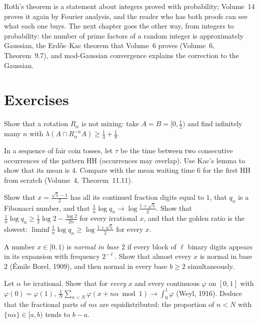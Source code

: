 Roth's theorem is a statement about integers proved with probability; Volume~14 proves it again by Fourier analysis, and the reader who has both
proofs can see what each one buys. The next chapter goes the other way, from integers to probability: the number of prime factors of a random
integer is approximately Gaussian, the Erd\H os--Kac theorem that Volume~6 proves (Volume~6, Theorem~9.7), and mod-Gaussian convergence explains the
correction to the Gaussian.

\section{Exercises}

\begin{exercise}[$\star$]\label{ex:rotnotmix}
Show that a rotation $R_\alpha$ is not mixing: take $A=B=[0,\frac12)$ and find infinitely many $n$ with $\lambda(A\cap R_\alpha^{-n}A)\ge\frac14+\frac18$.
\end{exercise}

\begin{exercise}[$\star$]\label{ex:kacword}
In a sequence of fair coin tosses, let $\tau$ be the time between two consecutive occurrences of the pattern HH (occurrences may overlap). Use Kac's lemma to show that its mean is $4$. Compare with the mean waiting time $6$
for the first HH from scratch (Volume~4, Theorem~11.11).
\end{exercise}

\begin{exercise}[$\star$]\label{ex:golden}
Show that $x=\frac{\sqrt5-1}2$ has all its continued fraction digits equal to $1$, that $q_n$ is a Fibonacci number, and that $\frac1n\log q_n\to\log\frac{1+\sqrt5}2$. Show that $\frac1n\log q_n\ge\frac12\log 2-\frac{\log2}{2n}$ for every
irrational $x$, and that the golden ratio is the slowest: $\liminf\frac1n\log q_n\ge\log\frac{1+\sqrt5}2$ for every $x$.
\end{exercise}

\begin{exercise}[$\star\star$]\label{ex:normal}
A number $x\in[0,1)$ is \emph{normal in base $2$} if every block of $\ell$ binary digits appears in its expansion with frequency $2^{-\ell}$. Show that almost every $x$ is normal in base $2$ (\'Emile Borel, 1909), and then normal in every
base $b\ge2$ simultaneously.
\end{exercise}

\begin{exercise}[$\star\star$]\label{ex:weyl}
Let $\alpha$ be irrational. Show that for \emph{every} $x$ and every continuous $\varphi$ on $[0,1]$ with $\varphi(0)=\varphi(1)$, $\frac1N\sum_{n<N}\varphi(x+n\alpha\bmod1)\to\int_0^1\varphi$ (Weyl, 1916). Deduce that the fractional parts of $n\alpha$ are
equidistributed: the proportion of $n<N$ with $\{n\alpha\}\in[a,b)$ tends to $b-a$.
\end{exercise}

